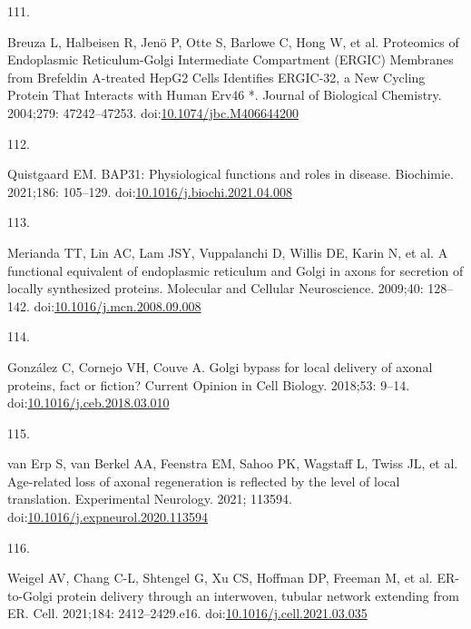 \documentclass[
  12pt,
  a4paper,
]{book}
\newlength{\cslhangindent}
\newlength{\csllabelwidth}
\newlength{\cslentryspacingunit} %
\newenvironment{CSLReferences}[2] %
 {%
  \setlength{\parindent}{0pt}
  \ifodd #1
  \let\oldpar\par
  \def\par{\hangindent=\cslhangindent\oldpar}
  \fi
  \setlength{\parskip}{#2\cslentryspacingunit}
 }%
 {}
\newcommand{\CSLLeftMargin}[1]{\parbox[t]{\csllabelwidth}{#1}}
\newcommand{\CSLRightInline}[1]{\parbox[t]{\linewidth - \csllabelwidth}{#1}\break}
\begin{document}
\begin{CSLReferences}{0}{0}
\leavevmode{}%
\CSLLeftMargin{111. }%
\CSLRightInline{Breuza L, Halbeisen R, Jenö P, Otte S, Barlowe C, Hong W, et al. Proteomics of {Endoplasmic Reticulum-Golgi Intermediate Compartment} ({ERGIC}) {Membranes} from {Brefeldin A-treated HepG2 Cells Identifies ERGIC-32}, a {New Cycling Protein That Interacts} with {Human Erv46} *. Journal of Biological Chemistry. 2004;279: 47242--47253. doi:\href{https://doi.org/10.1074/jbc.M406644200}{10.1074/jbc.M406644200}}

\leavevmode{}%
\CSLLeftMargin{112. }%
\CSLRightInline{Quistgaard EM. {BAP31}: {Physiological} functions and roles in disease. Biochimie. 2021;186: 105--129. doi:\href{https://doi.org/10.1016/j.biochi.2021.04.008}{10.1016/j.biochi.2021.04.008}}

\leavevmode{}%
\CSLLeftMargin{113. }%
\CSLRightInline{Merianda TT, Lin AC, Lam JSY, Vuppalanchi D, Willis DE, Karin N, et al. A functional equivalent of endoplasmic reticulum and {Golgi} in axons for secretion of locally synthesized proteins. Molecular and Cellular Neuroscience. 2009;40: 128--142. doi:\href{https://doi.org/10.1016/j.mcn.2008.09.008}{10.1016/j.mcn.2008.09.008}}

\leavevmode{}%
\CSLLeftMargin{114. }%
\CSLRightInline{González C, Cornejo VH, Couve A. Golgi bypass for local delivery of axonal proteins, fact or fiction? Current Opinion in Cell Biology. 2018;53: 9--14. doi:\href{https://doi.org/10.1016/j.ceb.2018.03.010}{10.1016/j.ceb.2018.03.010}}

\leavevmode{}%
\CSLLeftMargin{115. }%
\CSLRightInline{van Erp S, van Berkel AA, Feenstra EM, Sahoo PK, Wagstaff L, Twiss JL, et al. Age-related loss of axonal regeneration is reflected by the level of local translation. Experimental Neurology. 2021; 113594. doi:\href{https://doi.org/10.1016/j.expneurol.2020.113594}{10.1016/j.expneurol.2020.113594}}

\leavevmode{}%
\CSLLeftMargin{116. }%
\CSLRightInline{Weigel AV, Chang C-L, Shtengel G, Xu CS, Hoffman DP, Freeman M, et al. {ER-to-Golgi} protein delivery through an interwoven, tubular network extending from {ER}. Cell. 2021;184: 2412--2429.e16. doi:\href{https://doi.org/10.1016/j.cell.2021.03.035}{10.1016/j.cell.2021.03.035}}


\end{CSLReferences}
\end{document}
